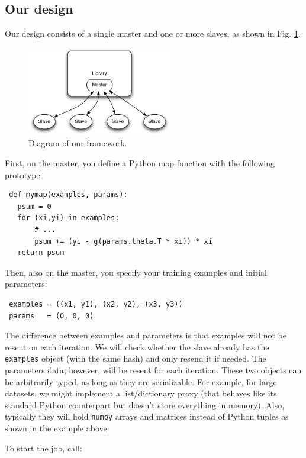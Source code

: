 \documentclass[%
  final,
  notitlepage,
  narroweqnarray,
  inline,
]{ieee}
\begin{document}
\subsection{Our design}

Our design consists of a single master and one or more slaves, as shown in
Fig. \ref{diagram}.

\begin{figure}[hb]
  \begin{center}
    \includegraphics[width=2.5in]{fwk_diagram/fwk_diagram.pdf}
  \end{center}
  \caption{Diagram of our framework.}
  \label{diagram}
\end{figure}

First, on the master, you define a Python map function with the following
prototype:
\begin{verbatim}
 def mymap(examples, params):
   psum = 0
   for (xi,yi) in examples:
       # ...
       psum += (yi - g(params.theta.T * xi)) * xi
   return psum
\end{verbatim}

Then, also on the master, you specify your training examples and initial
parameters:
\begin{verbatim}
 examples = ((x1, y1), (x2, y2), (x3, y3))
 params   = (0, 0, 0)
\end{verbatim}

The difference between examples and parameters is that examples will not be
resent on each iteration. We will check whether the slave already has the {\tt
  examples} object (with the same hash) and only resend it if needed. The
parameters data, however, will be resent for each iteration. These two objects
can be arbitrarily typed, as long as they are serializable. For example, for
large datasets, we might implement a list/dictionary proxy (that behaves like
its standard Python counterpart but doesn't store everything in memory). Also,
typically they will hold {\tt numpy} arrays and matrices instead of Python
tuples as shown in the example above.

To start the job, call:
\end{document}
